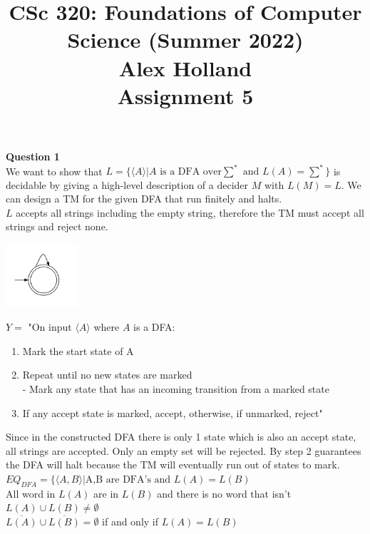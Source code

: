 \documentclass{article}
\title{%
   CSc 320: Foundations of Computer Science (Summer 2022)\\
    \Large Alex Holland\\
    Assignment 5\\
    }
\date{}
\begin{document}
\maketitle

{\bf Question 1}\\
We want to show that $L = \{ \langle A \rangle | A \text{ is a DFA over} \sum^* \text{ and } L(A) = \sum^* \}$ is decidable by giving a high-level description of a decider $M$ with $L(M)=L$. We can design a TM for the given DFA that run finitely and halts.\\

$L$ accepts all strings including the empty string, therefore the TM must accept all
strings and reject none.\\

\begin{center}
    \includegraphics[width=0.2\textwidth]{1.png}
\end{center}

$Y=$ "On input $\langle A \rangle$ where $A$ is a DFA:
\begin{enumerate}
  \item Mark the start state of A
  \item Repeat until no new states are marked\\ - Mark any state that has an incoming transition from a marked state
  \item If any accept state is marked, accept, otherwise, if unmarked, reject"
\end{enumerate}

Since in the constructed DFA there is only 1 state which is also an accept state, all strings are accepted. Only an empty set will be rejected. By step 2 guarantees the DFA will halt because the TM will eventually run out of states to mark.\\

$EQ_{DFA} = \{ \langle A, B \rangle | \text{A,B are DFA's and } L(A) = L(B)$\\

All word in $L(A)$ are in $L(B)$ and there is no word that isn't\\
$L(A) \cup L(B) \neq \emptyset$\\
$\overline{L(A)} \cup \overline{L(B)} = \emptyset$
if and only if $L(A) = L(B)$
\end{document}
